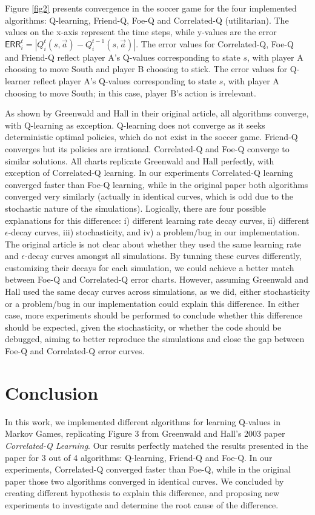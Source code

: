 \documentclass{article}
\begin{document}
    Figure \ref{fig2} presents convergence in the soccer game for the four implemented algorithms: Q-learning, Friend-Q, Foe-Q and Correlated-Q (utilitarian).
    The values on the x-axis represent the time steps, while y-values are the error $\mathsf{ERR}_{i}^{t} = | Q_{i}^{t}(s, \vec{a}) - Q_{i}^{t - 1}(s, \vec{a}) |$.
    The error values for Correlated-Q, Foe-Q and Friend-Q reflect player A's Q-values corresponding to state $s$, with player A choosing to move South and player B choosing to stick.
    The error values for Q-learner reflect player A's Q-values corresponding to state $s$, with player A choosing to move South; in this case, player B's action is irrelevant.

    As shown by Greenwald and Hall in their original article, all algorithms converge, with Q-learning as exception.
    Q-learning does not converge as it seeks deterministic optimal policies, which do not exist in the soccer game.
    Friend-Q converges but its policies are irrational.
    Correlated-Q and Foe-Q converge to similar solutions.
    All charts replicate Greenwald and Hall perfectly, with exception of Correlated-Q learning.
    In our experiments Correlated-Q learning converged faster than Foe-Q learning, while in the original paper both algorithms converged very similarly (actually in identical curves, which is odd due to the stochastic nature of the simulations).
    Logically, there are four possible explanations for this difference: i) different learning rate decay curves, ii) different $\epsilon$-decay curves, iii) stochasticity, and iv) a problem/bug in our implementation.
    The original article is not clear about whether they used the same learning rate and $\epsilon$-decay curves amongst all simulations.
    By tunning these curves differently, customizing their decays for each simulation, we could achieve a better match between Foe-Q and Correlated-Q error charts.
    However, assuming Greenwald and Hall used the same decay curves across simulations, as we did, either stochasticity or a problem/bug in our implementation could explain this difference.
    In either case, more experiments should be performed to conclude whether this difference should be expected, given the stochasticity, or whether the code should be debugged, aiming to better reproduce the simulations and close the gap between Foe-Q and Correlated-Q error curves.

    \section{Conclusion}
    \label{sec:conclusion}

    In this work, we implemented different algorithms for learning Q-values in Markov Games, replicating Figure 3 from Greenwald and Hall's 2003 paper \emph{Correlated-Q Learning}.
    Our results perfectly matched the results presented in the paper for 3 out of 4 algorithms: Q-learning, Friend-Q and Foe-Q.
    In our experiments, Correlated-Q converged faster than Foe-Q, while in the original paper those two algorithms converged in identical curves.
    We concluded by creating different hypothesis to explain this difference, and proposing new experiments to investigate and determine the root cause of the difference.

\printbibliography
\end{document}
